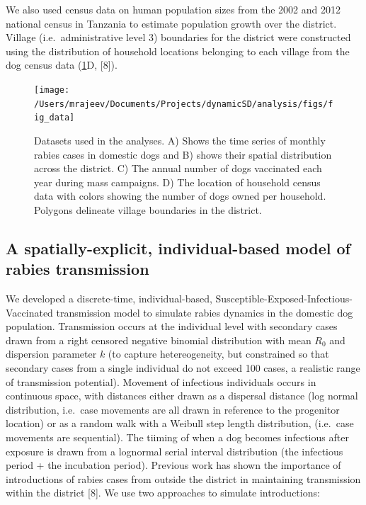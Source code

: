 \documentclass[
]{book}
\begin{document}
We also used census data on human population sizes from the 2002 and 2012 national census in Tanzania to estimate population growth over the district. Village (i.e.~administrative level 3) boundaries for the district were constructed using the distribution of household locations belonging to each village from the dog census data (\ref{fig:data}D, {[}8{]}).

\begin{figure}
\texttt{[image: /Users/mrajeev/Documents/Projects/dynamicSD/analysis/figs/fig\_data]} \caption{Datasets used in the analyses. A) Shows the time series of monthly rabies cases in domestic dogs and B) shows their spatial distribution across the district. C) The annual number of dogs vaccinated each year during mass campaigns. D) The location of household census data with colors showing the number of dogs owned per household. Polygons delineate village boundaries in the district.}\label{fig:data}
\end{figure}



\hypertarget{a-spatially-explicit-individual-based-model-of-rabies-transmission}{%
\subsection{A spatially-explicit, individual-based model of rabies transmission}\label{a-spatially-explicit-individual-based-model-of-rabies-transmission}}

We developed a discrete-time, individual-based, Susceptible-Exposed-Infectious-Vaccinated transmission model to simulate rabies dynamics in the domestic dog population. Transmission occurs at the individual level with secondary cases drawn from a right censored negative binomial distribution with mean \(R_{0}\) and dispersion parameter \(k\) (to capture hetereogeneity, but constrained so that secondary cases from a single individual do not exceed 100 cases, a realistic range of transmission potential). Movement of infectious individuals occurs in continuous space, with distances either drawn as a dispersal distance (log normal distribution, i.e.~case movements are all drawn in reference to the progenitor location) or as a random walk with a Weibull step length distribution, (i.e.~case movements are sequential). The tiiming of when a dog becomes infectious after exposure is drawn from a lognormal serial interval distribution (the infectious period + the incubation period). Previous work has shown the importance of introductions of rabies cases from outside the district in maintaining transmission within the district {[}8{]}. We use two approaches to simulate introductions:
\end{document}
